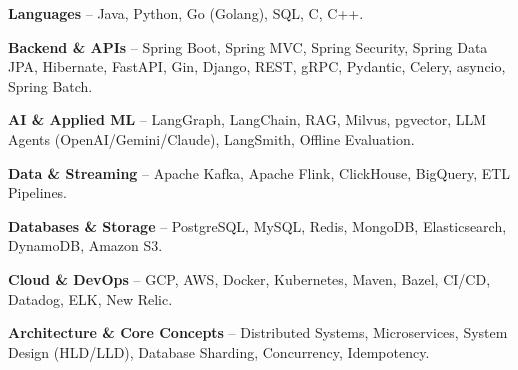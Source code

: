 \begin{zitemize}
\item \textbf{Languages} -- Java, Python, Go (Golang), SQL, C, C++.
\item \textbf{Backend \& APIs} -- Spring Boot, Spring MVC, Spring Security, Spring Data JPA, Hibernate, FastAPI, Gin, Django, REST, gRPC, Pydantic, Celery, asyncio, Spring Batch.
\item \textbf{AI \& Applied ML} -- LangGraph, LangChain, RAG, Milvus, pgvector, LLM Agents (OpenAI/Gemini/Claude), LangSmith, Offline Evaluation.
\item \textbf{Data \& Streaming} -- Apache Kafka, Apache Flink, ClickHouse, BigQuery, ETL Pipelines.
\item \textbf{Databases \& Storage} -- PostgreSQL, MySQL, Redis, MongoDB, Elasticsearch, DynamoDB, Amazon S3.
\item \textbf{Cloud \& DevOps} -- GCP, AWS, Docker, Kubernetes, Maven, Bazel, CI/CD, Datadog, ELK, New Relic.
\item \textbf{Architecture \& Core Concepts} -- Distributed Systems, Microservices, System Design (HLD/LLD), Database Sharding, Concurrency, Idempotency.
\end{zitemize}
